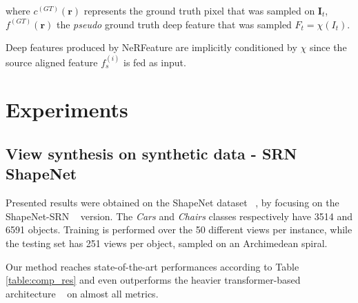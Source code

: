 where $c^{(GT)}(\mathbf{r})$ represents the ground truth pixel that was sampled on $\mathbf{I}_{t}$, $f^{(GT)}(\mathbf{r})$ the \textit{pseudo} ground truth deep feature that was sampled $F_{t}=\chi(I_{t})$.


Deep features produced by NeRFeature are implicitly conditioned by $\chi$ since the source aligned feature $f_s^{(i)}$ is fed as input. 

\section{Experiments}
\subsection{View synthesis on synthetic data - SRN ShapeNet}
Presented results were obtained on the ShapeNet dataset ~\citep{chang2015shapenet}, by focusing on the ShapeNet-SRN ~\citep{sitzmann2019scene} version. The \textit{Cars} and \textit{Chairs} classes respectively have 3514 and 6591 objects. Training is performed over the 50 different views per instance, while the testing set has 251 views per object, sampled on an Archimedean spiral.\newline

Our method reaches state-of-the-art performances according to Table \ref{table:comp_res} and even outperforms the heavier transformer-based architecture ~\citep{lin2023vision} on almost all metrics. 

